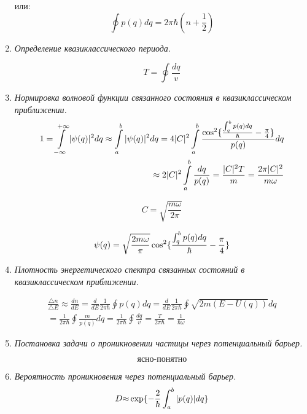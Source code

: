\documentclass{article}
\begin{document}
\begin{enumerate}
или: 
\begin{equation}
\oint p(q)dq=2\pi\hbar(n+\frac{1}{2})
\end{equation}


		\item \textit{Определение квазиклассического периода.} 

\begin{equation}
T=\oint\frac{dq}{v}
\end{equation}


		\item \textit{Нормировка волновой функции связанного состояния в квазиклассическом приближении.} 
\begin{equation}
\begin{split}
1=\intop_{-\infty}^{+\infty}|\psi(q)|^{2}dq\approx\intop_{a}^{b}|\psi(q)|^{2}dq=4|C|^{2}\intop_{a}^{b}\frac{\cos^{2}\{\frac{\intop_{q}^{b}p(q)dq}{\hbar}-\frac{\pi}{4}\}}{p(q)}dq \\
\approx2|C|^{2}\intop_{a}^{b}\frac{dq}{p(q)}=\frac{|C|^{2}T}{m}=\frac{2\pi|C|^{2}}{m\omega}
\end{split}
\end{equation}


\begin{equation}
C=\sqrt{\frac{m\omega}{2\pi}}
\end{equation}


\begin{equation}
\psi(q)=\sqrt{\frac{2m\omega}{\pi}}\cos^{2}\{\frac{\intop_{q}^{b}p(q)dq}{\hbar}-\frac{\pi}{4}\}
\end{equation}


		\item \textit{Плотность энергетического спектра связанных состояний в квазиклассическом приближении.} 

\begin{equation}
\begin{split}
\frac{\triangle n}{\triangle E}\approx\frac{dn}{dE}=\frac{d}{dE}\frac{1}{2\pi\hbar}\oint p(q)dq=\frac{d}{dE}\frac{1}{2\pi\hbar}\oint\sqrt{2m(E-U(q))}dq \\
=\frac{1}{2\pi\hbar}\oint\frac{m}{p(q)}dq=\frac{1}{2\pi\hbar}\oint\frac{dq}{v}=\frac{T}{2\pi\hbar}=\frac{1}{\hbar\omega}
\end{split}
\end{equation}


		\item \textit{Постановка задачи о проникновении частицы через потенциальный барьер.} 

\begin{equation}
\text{ясно-понятно}
\end{equation}


		\item \textit{Вероятность проникновения через потенциальный барьер.}
\begin{equation}
D\text{\ensuremath{\approx}}\exp\{-\frac{2}{\hbar}\int_{a}^{b}|p(q)|dq\}
\end{equation}
	\end{enumerate}
	
\end{document}
